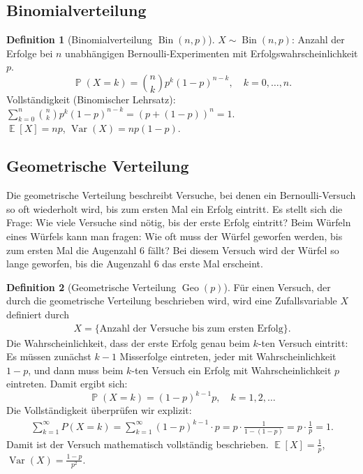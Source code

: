 ﻿\documentclass[12pt,a4paper]{article}
\theoremstyle{definition}
\newtheorem{definition}{Definition}[section]
\theoremstyle{plain}
\theoremstyle{remark}
\DeclareMathOperator{\E}{\mathbb{E}}
\DeclareMathOperator{\Var}{Var}
\DeclareMathOperator{\Prob}{\mathbb{P}}
\begin{document}
\subsection{Binomialverteilung}

\begin{definition}[Binomialverteilung $\operatorname{Bin}(n,p)$]\label{def:binom}
  $X \sim \operatorname{Bin}(n,p)$: Anzahl der Erfolge bei $n$ unabhängigen
  Bernoulli-Experimen\-ten mit Erfolgswahrscheinlichkeit $p$.
  \[
    \Prob(X=k) = \binom{n}{k} p^k (1-p)^{n-k}, \quad k=0,\ldots,n.
  \]
  Vollständigkeit (Binomischer Lehrsatz):
  $\sum_{k=0}^{n}\binom{n}{k}p^k(1-p)^{n-k} = (p+(1-p))^n = 1$. \\
  $\E[X] = np$, $\Var(X) = np(1-p)$.
\end{definition}

\subsection{Geometrische Verteilung}

Die geometrische Verteilung beschreibt Versuche, bei denen ein
Bernoulli-Versuch so oft wiederholt wird, bis zum ersten Mal ein Erfolg
eintritt. Es stellt sich die Frage: Wie viele Versuche sind nötig, bis der
erste Erfolg eintritt? Beim Würfeln eines Würfels kann man fragen: Wie oft
muss der Würfel geworfen werden, bis zum ersten Mal die Augenzahl $6$ fällt?
Bei diesem Versuch wird der Würfel so lange geworfen, bis die Augenzahl $6$
das erste Mal erscheint.

\begin{definition}[Geometrische Verteilung $\operatorname{Geo}(p)$]\label{def:geo}
  Für einen Versuch, der durch die geometrische Verteilung beschrieben wird,
  wird eine Zufallsvariable $X$ definiert durch
  \begin{align}
    X = \{\text{Anzahl der Versuche bis zum ersten Erfolg}\}.
  \end{align}
  Die Wahrscheinlichkeit, dass der erste Erfolg genau beim $k$-ten Versuch
  eintritt: Es müssen zunächst $k-1$ Misserfolge eintreten, jeder mit
  Wahrscheinlichkeit $1-p$, und dann muss beim $k$-ten Versuch ein Erfolg
  mit Wahrscheinlichkeit $p$ eintreten. Damit ergibt sich:
  \[
    \Prob(X=k) = (1-p)^{k-1} p, \quad k = 1, 2, \ldots
  \]
  Die Vollständigkeit überprüfen wir explizit:
  \begin{align}
    \sum_{k=1}^{\infty} P(X = k)
    = \sum_{k=1}^{\infty} (1-p)^{k-1} \cdot p
    = p \cdot \frac{1}{1-(1-p)} = p \cdot \frac{1}{p} = 1.
  \end{align}
  Damit ist der Versuch mathematisch vollständig beschrieben.
  $\E[X] = \frac{1}{p}$, $\Var(X) = \frac{1-p}{p^2}$.
\end{definition}
\end{document}

